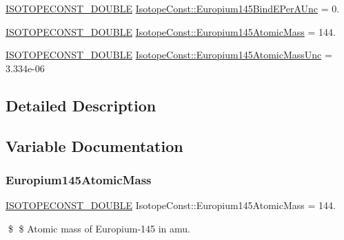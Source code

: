 \begin{DoxyCompactItemize}
\mbox{\hyperlink{group___isotope_const-_macros_ga8f45a7272ce02c0b4c65c44636ed719a}{I\+S\+O\+T\+O\+P\+E\+C\+O\+N\+S\+T\+\_\+\+D\+O\+U\+B\+LE}} \mbox{\hyperlink{group___isotope_const-_europium-_eu145_ga7bc33f053c63286057e535045cc2db25}{Isotope\+Const\+::\+Europium145\+Bind\+E\+Per\+A\+Unc}} = 0.
\item 
\mbox{\hyperlink{group___isotope_const-_macros_ga8f45a7272ce02c0b4c65c44636ed719a}{I\+S\+O\+T\+O\+P\+E\+C\+O\+N\+S\+T\+\_\+\+D\+O\+U\+B\+LE}} \mbox{\hyperlink{group___isotope_const-_europium-_eu145_gaf914de51edf457349f9e801ff13bcb18}{Isotope\+Const\+::\+Europium145\+Atomic\+Mass}} = 144.
\item 
\mbox{\hyperlink{group___isotope_const-_macros_ga8f45a7272ce02c0b4c65c44636ed719a}{I\+S\+O\+T\+O\+P\+E\+C\+O\+N\+S\+T\+\_\+\+D\+O\+U\+B\+LE}} \mbox{\hyperlink{group___isotope_const-_europium-_eu145_ga4fb34831d296cf0e90ae7a53c6d9af5d}{Isotope\+Const\+::\+Europium145\+Atomic\+Mass\+Unc}} = 3.\+334e-\/06
\end{DoxyCompactItemize}


\subsection{Detailed Description}


\subsection{Variable Documentation}
\mbox{\label{group___isotope_const-_europium-_eu145_gaf914de51edf457349f9e801ff13bcb18}} 
\subsubsection{\texorpdfstring{Europium145\+Atomic\+Mass}{Europium145AtomicMass}}
{\footnotesize\ttfamily \mbox{\hyperlink{group___isotope_const-_macros_ga8f45a7272ce02c0b4c65c44636ed719a}{I\+S\+O\+T\+O\+P\+E\+C\+O\+N\+S\+T\+\_\+\+D\+O\+U\+B\+LE}} Isotope\+Const\+::\+Europium145\+Atomic\+Mass = 144.}

\$ \$ Atomic mass of Europium-\/145 in amu. \mbox{\label{group___isotope_const-_europium-_eu145_ga4fb34831d296cf0e90ae7a53c6d9af5d}} 
